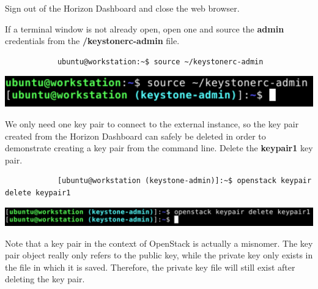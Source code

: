 \documentclass[letterpaper, 12pt]{article}
\begin{document}
\begin{enumerate}
    \begin{labstep}
        Sign out of the Horizon Dashboard and close the web browser.
    \end{labstep}

    \begin{labstep}
        If a terminal window is not already open, open one and source the \textbf{admin} credentials from the \textbf{\texttildemid/keystonerc-admin} file.
        \begin{lstlisting}
            ubuntu@workstation:~$ source ~/keystonerc-admin
        \end{lstlisting}

        \begin{center}
            \includegraphics[width=\linewidth]{images/part4/step4.png}
        \end{center}
    \end{labstep}

    \begin{labstep}
        We only need one key pair to connect to the external instance, so the key pair created from the Horizon Dashboard can safely be deleted in order to demonstrate creating a key pair from the command line.
        Delete the \textbf{keypair1} key pair.
        \begin{lstlisting}
            [ubuntu@workstation (keystone-admin)]:~$ openstack keypair delete keypair1
        \end{lstlisting}

        \begin{center}
            \includegraphics[width=\linewidth]{images/part4/step5.png}
        \end{center}
    \end{labstep}

    \begin{notebox}
        Note that a key pair in the context of OpenStack is actually a misnomer.
        The key pair object really only refers to the public key, while the private key only exists in the file in which it is saved.
        Therefore, the private key file will still exist after deleting the key pair.
    \end{notebox}


\end{enumerate}
\end{document}
